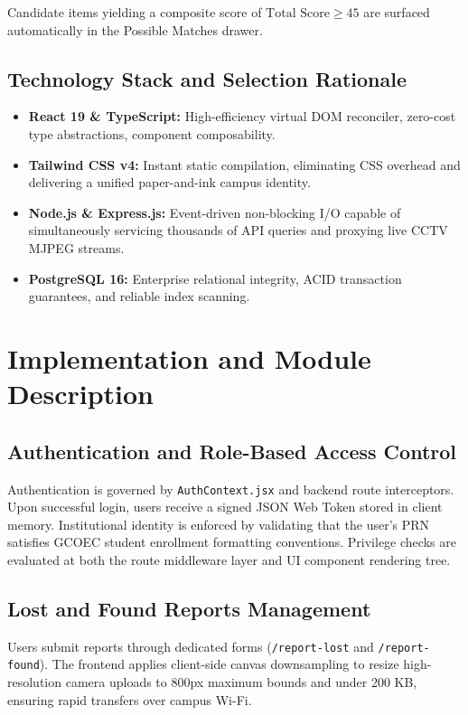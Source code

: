 \documentclass[11pt,a4paper]{article}
\begin{document}
Candidate items yielding a composite score of $\text{Total Score} \ge 45$ are surfaced automatically in the Possible Matches drawer.

\subsection{Technology Stack and Selection Rationale}
\begin{itemize}
    \item \textbf{React 19 \& TypeScript:} High-efficiency virtual DOM reconciler, zero-cost type abstractions, component composability.
    \item \textbf{Tailwind CSS v4:} Instant static compilation, eliminating CSS overhead and delivering a unified paper-and-ink campus identity.
    \item \textbf{Node.js \& Express.js:} Event-driven non-blocking I/O capable of simultaneously servicing thousands of API queries and proxying live CCTV MJPEG streams.
    \item \textbf{PostgreSQL 16:} Enterprise relational integrity, ACID transaction guarantees, and reliable index scanning.
\end{itemize}

\newpage

\section{Implementation and Module Description}

\subsection{Authentication and Role-Based Access Control}
Authentication is governed by \texttt{AuthContext.jsx} and backend route interceptors. Upon successful login, users receive a signed JSON Web Token stored in client memory. Institutional identity is enforced by validating that the user's PRN satisfies GCOEC student enrollment formatting conventions. Privilege checks are evaluated at both the route middleware layer and UI component rendering tree.

\subsection{Lost and Found Reports Management}
Users submit reports through dedicated forms (\texttt{/report-lost} and \texttt{/report-found}). The frontend applies client-side canvas downsampling to resize high-resolution camera uploads to 800px maximum bounds and under 200 KB, ensuring rapid transfers over campus Wi-Fi.
\end{document}
